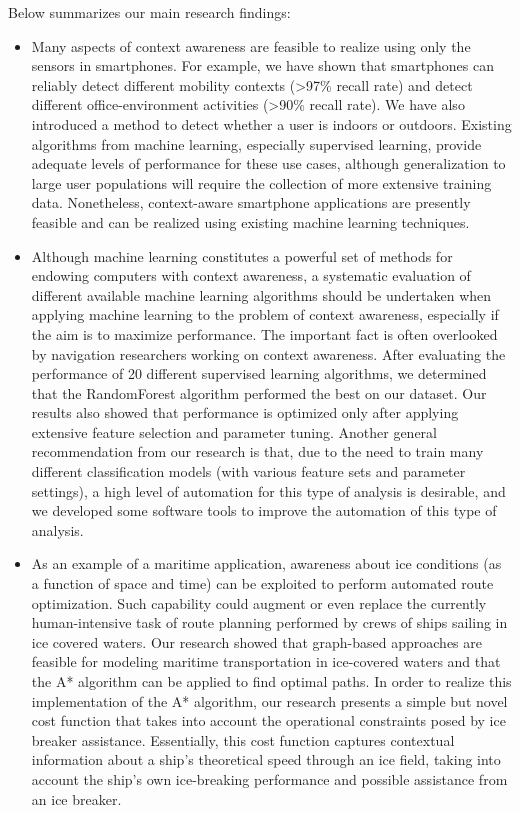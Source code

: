 Below summarizes our main research findings:
%
\begin{itemize}
\item Many aspects of context awareness are feasible to realize using only the sensors in smartphones. For example, we have shown that smartphones can reliably detect different mobility contexts (\textgreater97\% recall rate) and detect different office-environment activities (\textgreater90\% recall rate). We have also introduced a method to detect whether a user is indoors or outdoors. Existing algorithms from machine learning, especially supervised learning, provide adequate levels of performance for these use cases, although generalization to large user populations will require the collection of more extensive training data. Nonetheless, context-aware smartphone applications are presently feasible and can be realized using existing machine learning techniques.
%
\item Although machine learning constitutes a powerful set of methods for endowing computers with context awareness, a systematic evaluation of different available machine learning algorithms should be undertaken when applying machine learning to the problem of context awareness, especially if the aim is to maximize performance. The important fact is often overlooked by navigation researchers working on context awareness. After evaluating the performance of 20 different supervised learning algorithms, we determined that the RandomForest algorithm performed the best on our dataset. Our results also showed that performance is optimized only after applying extensive feature selection and parameter tuning. Another general recommendation from our research is that, due to the need to train many different classification models (with various feature sets and parameter settings), a high level of automation for this type of analysis is desirable, and we developed some software tools to improve the automation of this type of analysis.
%
\item As an example of a maritime application, awareness about ice conditions (as a function of space and time) can be exploited to perform automated route optimization. Such capability could augment or even replace the currently human-intensive task of route planning performed by crews of ships sailing in ice covered waters. Our research showed that graph-based approaches are feasible for modeling maritime transportation in ice-covered waters and that the A* algorithm can be applied to find optimal paths. In order to realize this implementation of the A* algorithm, our research presents a simple but novel cost function that takes into account the operational constraints posed by ice breaker assistance. Essentially, this cost function captures contextual information about a ship's theoretical speed through an ice field, taking into account the ship's own ice-breaking performance and possible assistance from an ice breaker.

\end{itemize}

